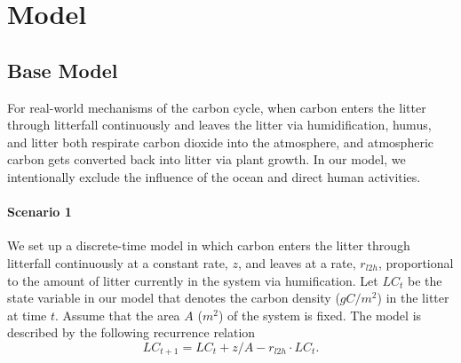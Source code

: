 \documentclass[a4paper]{article}
\begin{document}
\section{Model}

\subsection{Base Model}


    For real-world mechanisms of the carbon cycle, when carbon enters the litter through litterfall continuously and leaves the litter via humidification, humus, and litter both respirate carbon dioxide into the atmosphere, and atmospheric carbon gets converted back into litter via plant growth. In our model, we intentionally exclude the influence of the ocean and direct human activities.

    \paragraph{Scenario 1} We set up a discrete-time model in which carbon enters the litter through litterfall continuously at a constant rate, $z$, and leaves at a rate, $r_{l2h}$, proportional to the amount of litter currently in the system via humification. Let $LC_t$ be the state variable in our model that denotes the carbon density ($gC/m^2$) in the litter at time $t$. Assume that the area $A$ ($m^2$) of the system is fixed. The model is described by the following recurrence relation \begin{equation}
        LC_{t+1} = LC_{t} + z/A  - r_{l2h} \cdot LC_{t}.
    \end{equation}
    
\end{document}
